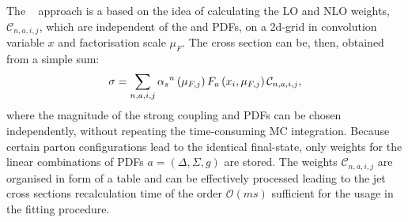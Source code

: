 The \fastnlo~\cite{fastnlo1,fastnlo2,fastnlo3,fastnlo4} approach is a based on the idea of calculating the LO and NLO weights, $\mathcal{C}_{n,a,i,j}$, which are independent of the \as and PDFs, on a 2d-grid in convolution variable $x$ and factorisation scale $\mu_F$. The cross section can be, then, obtained from a simple sum:
\begin{equation}
\sigma = \sum_{n,a,i,j}{ \mbox{$\alpha_{s}$}^n\left( \mu_{F,j} \right) F_a\left( x_i, \mu_{F,j}\right)\mathcal{C}_{n,a,i,j} },
\end{equation}
where the magnitude of the strong coupling and PDFs can be chosen independently, without repeating the time-consuming MC integration. Because certain parton configurations lead to the identical final-state, only weights for the linear combinations of PDFs $a=\left( \Delta, \Sigma, g\right) $ are stored. The weights $\mathcal{C}_{n,a,i,j}$ are organised in form of a table and can be effectively processed leading to the jet cross sections recalculation time of the order $\mathcal{O}\left( ms\right)$ sufficient for the usage in the fitting procedure.

